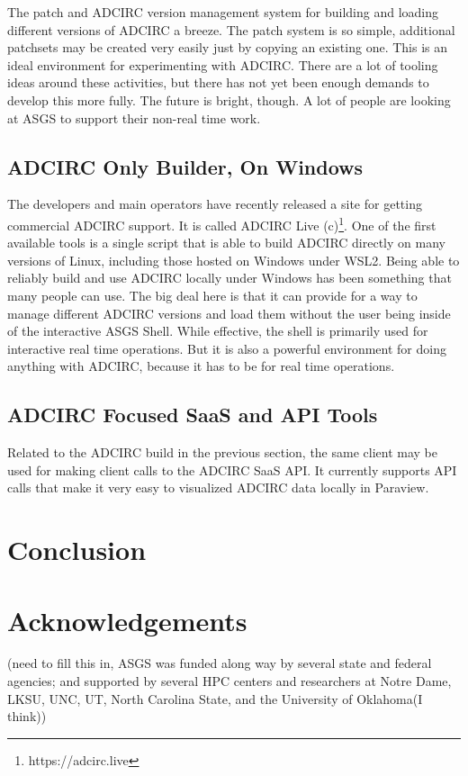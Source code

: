 \documentclass{article}
\begin{document}
The patch and ADCIRC version management system for building and loading
different versions of ADCIRC a breeze. The patch system is so simple, additional
patchsets may be created very easily just by copying an existing one. This is an
ideal environment for experimenting with ADCIRC. There are a lot of tooling
ideas around these activities, but there has not yet been enough demands to
develop this more fully. The future is bright, though. A lot of people are
looking at ASGS to support their non-real time work.

\subsection{ADCIRC Only Builder, On Windows}

The developers and main operators have recently released a site for getting
commercial ADCIRC support. It is called ADCIRC Live
(c)\footnote{https://adcirc.live}. One of the first available tools is a
single script that is able to build ADCIRC directly on many versions of Linux,
including those hosted on Windows under WSL2. Being able to reliably build and
use ADCIRC locally under Windows has been something that many people can use.
The big deal here is that it can provide for a way to manage different ADCIRC
versions and load them without the user being inside of the interactive ASGS
Shell. While effective, the shell is primarily used for interactive real time
operations. But it is also a powerful environment for doing anything with
ADCIRC, because it has to be for real time operations.

\subsection{ADCIRC Focused SaaS and API Tools} Related to the ADCIRC build in
the previous section, the same client may be used for making client calls to the
ADCIRC SaaS API. It currently supports API calls that make it very easy to
visualized ADCIRC data locally in Paraview.

\section{Conclusion}

\section{Acknowledgements} (need to fill this in, ASGS was funded along way by
several state and federal agencies; and supported by several HPC centers and
researchers at Notre Dame, LKSU, UNC, UT, North Carolina State, and the
University of Oklahoma(I think))

\break

\end{document}
